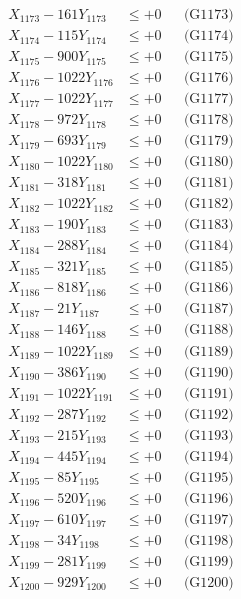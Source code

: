 \documentclass[a4paper,10pt]{article}
\begin{document}
{\begin{align}
X_{1173} - 161Y_{1173} &\leq +0 && \text{(G1173)} \\
X_{1174} - 115Y_{1174} &\leq +0 && \text{(G1174)} \\
X_{1175} - 900Y_{1175} &\leq +0 && \text{(G1175)} \\
X_{1176} - 1022Y_{1176} &\leq +0 && \text{(G1176)} \\
X_{1177} - 1022Y_{1177} &\leq +0 && \text{(G1177)} \\
X_{1178} - 972Y_{1178} &\leq +0 && \text{(G1178)} \\
X_{1179} - 693Y_{1179} &\leq +0 && \text{(G1179)} \\
X_{1180} - 1022Y_{1180} &\leq +0 && \text{(G1180)} \\
\allowbreak
X_{1181} - 318Y_{1181} &\leq +0 && \text{(G1181)} \\
X_{1182} - 1022Y_{1182} &\leq +0 && \text{(G1182)} \\
X_{1183} - 190Y_{1183} &\leq +0 && \text{(G1183)} \\
X_{1184} - 288Y_{1184} &\leq +0 && \text{(G1184)} \\
X_{1185} - 321Y_{1185} &\leq +0 && \text{(G1185)} \\
X_{1186} - 818Y_{1186} &\leq +0 && \text{(G1186)} \\
X_{1187} - 21Y_{1187} &\leq +0 && \text{(G1187)} \\
X_{1188} - 146Y_{1188} &\leq +0 && \text{(G1188)} \\
X_{1189} - 1022Y_{1189} &\leq +0 && \text{(G1189)} \\
X_{1190} - 386Y_{1190} &\leq +0 && \text{(G1190)} \\
\allowbreak
X_{1191} - 1022Y_{1191} &\leq +0 && \text{(G1191)} \\
X_{1192} - 287Y_{1192} &\leq +0 && \text{(G1192)} \\
X_{1193} - 215Y_{1193} &\leq +0 && \text{(G1193)} \\
X_{1194} - 445Y_{1194} &\leq +0 && \text{(G1194)} \\
X_{1195} - 85Y_{1195} &\leq +0 && \text{(G1195)} \\
X_{1196} - 520Y_{1196} &\leq +0 && \text{(G1196)} \\
X_{1197} - 610Y_{1197} &\leq +0 && \text{(G1197)} \\
X_{1198} - 34Y_{1198} &\leq +0 && \text{(G1198)} \\
X_{1199} - 281Y_{1199} &\leq +0 && \text{(G1199)} \\
X_{1200} - 929Y_{1200} &\leq +0 && \text{(G1200)} \\

\end{align}}
\end{document}
